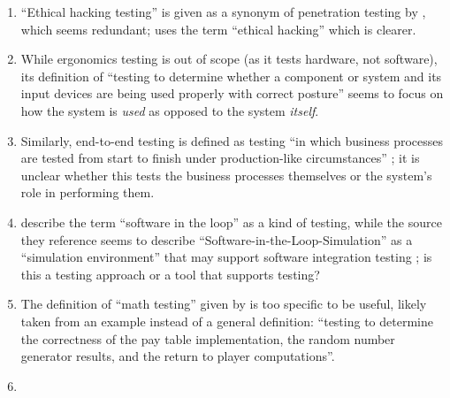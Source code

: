 \begin{enumerate}
    \item %
          ``Ethical hacking testing'' is given as a synonym of penetration
          testing by \citet[p.~13-4]{SWEBOK2024}, which seems redundant;
          \citet[p.~28]{Gerrard2000b} uses the term ``ethical hacking'' which
          is clearer.
    \item %
          While ergonomics testing is out of scope (as it tests hardware, not
          software), its definition of ``testing to determine whether a
          component or system and its input devices are being used properly
          with correct posture'' \citepISTQB{} seems to focus on how the
          system is \emph{used} as opposed to the system \emph{itself}.
    \item %
          Similarly, end-to-end testing is defined as testing ``in which
          business processes are tested from start to finish under
          production-like circumstances'' \citepISTQB{}; it is unclear
          whether this tests the business processes themselves or the system's
          role in performing them.
    \item %
          \citetISTQB{} describe the term ``software in the loop'' as a
          kind of testing, while the source they reference
          seems to describe
          ``Software-in-the-Loop-Simulation'' as a ``simulation environment''
          that may support software integration testing
          \citep[p.~153]{SPICE2022}; is this a testing approach or a tool
          that supports testing?
    \item %
           \label{specificISTQB}
          The definition of ``math testing'' given by \citetISTQB{} is
          too specific to be useful, likely taken from an example instead of
          a general definition: ``testing to determine the correctness of the
          pay table implementation, the random number generator results, and
          the return to player computations''.
    \item %

\end{enumerate}
